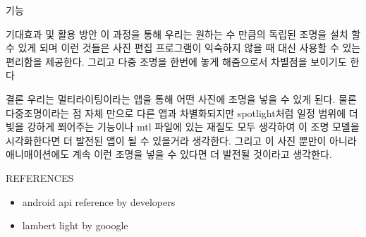\documentclass[a0paper,portrait]{baposter}
\begin{document}
\begin{poster}
\begin{posterbox}[name=equation,column=1,below=intro]{기능}
\end{posterbox}


\begin{posterbox}[name=figures,column=1,below=equation]{기대효과 및 활용 방안}
이 과정을 통해 우리는 원하는 수 만큼의 독립된 조명을 설치 할 수 있게 되며 이런 것들은 사진 편집 프로그램이 익숙하지 않을 때 대신 사용할 수 있는 편리함을 제공한다. 그리고 다중 조명을 한번에 놓게 해줌으로서 차별점을 보이기도 한다
\end{posterbox}

\begin{posterbox}[name=feedback,column=1,below=figures]{결론}
  우리는 멀티라이팅이라는 앱을 통해 어떤 사진에 조명을 넣을 수 있게 된다. 물론 다중조명이라는 점 자체 만으로 다른 앱과 차별화되지만 spotlight처럼 일정 범위에 더 빛을 강하게 쬐어주는 기능이나 mtl 파일에 있는 재질도 모두 생각하여 이 조명 모델을 시각화한다면 더 발전된 앱이 될 수 있을거라 생각한다. 그리고 이 사진 뿐만이 아니라 애니매이션에도 계속 이런 조명을 넣을 수 있다면 더 발전될 것이라고 생각한다.
\end{posterbox}

\begin{posterbox}[name=refs,span=2,column=0,below=install,above=bottom]{REFERENCES}
	\begin{itemize}
		\item android api reference by developers
		\item lambert light by gooogle
	\end{itemize}
\end{posterbox}

\end{poster}
\end{document}
